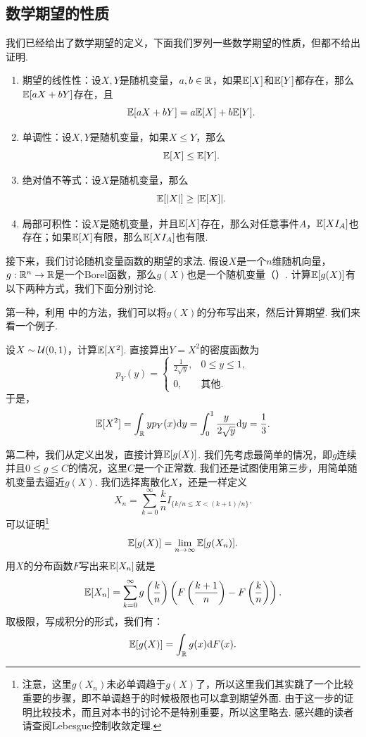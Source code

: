 \subsection{数学期望的性质}

我们已经给出了数学期望的定义，下面我们罗列一些数学期望的性质，但都不给出证明. 

\begin{proposition}\label{proposition:expectation-property}
\begin{enumerate}
\item 期望的线性性：设$X,Y$是随机变量，$a,b\in\mathbb{R}$，如果$\mathbb{E}[X]$和$\mathbb{E}[Y]$都存在，那么$\mathbb{E}[aX+bY]$存在，且
\[\mathbb{E}[aX+bY]=a\mathbb{E}[X]+b\mathbb{E}[Y].\]
\item 单调性：设$X,Y$是随机变量，如果$X\leq Y$，那么
\[\mathbb{E}[X]\leq \mathbb{E}[Y].\]
\item 绝对值不等式：设$X$是随机变量，那么
\[\mathbb{E}[|X|]\geq |\mathbb{E}[X]|.\]
\item 局部可积性：设$X$是随机变量，并且$\mathbb{E}[X]$存在，那么对任意事件$A$，$\mathbb{E}[XI_A]$也存在；如果$\mathbb{E}[X]$有限，那么$\mathbb{E}[XI_A]$也有限. 
\end{enumerate}
\end{proposition}

接下来，我们讨论随机变量函数的期望的求法. 假设$X$是一个$n$维随机向量，$g:\mathbb{R}^n\to\mathbb{R}$是一个Borel函数，那么$g(X)$也是一个随机变量（）. 计算$\mathbb{E}[g(X)]$有以下两种方式，我们下面分别讨论. 

第一种，利用 中的方法，我们可以将$g(X)$的分布写出来，然后计算期望. 我们来看一个例子. 

\begin{example}\label{example:uniform-square}
设$X\sim\mathcal{U}(0,1)$，计算$\mathbb{E}[X^2]$. 直接算出$Y=X^2$的密度函数为
\[p_Y(y)=\begin{cases}
    \frac{1}{2\sqrt{y}},&0\leq y\leq 1,\\
    0,&\text{其他}.
\end{cases}\]
于是，
\[\mathbb{E}[X^2]=\int_{\mathbb{R}} y p_Y(x)\mathrm{d} y=\int_0^1\frac{y}{2\sqrt{y}}\mathrm{d} y=\frac{1}{3}.\]
\end{example}

第二种，我们从定义出发，直接计算$\mathbb{E}[g(X)]$. 我们先考虑最简单的情况，即$g$连续并且$0\leq g\leq C$的情况，这里$C$是一个正常数. 我们还是试图使用第三步，用简单随机变量去逼近$g(X)$. 我们选择离散化$X$，还是一样定义
\[X_n=\sum_{k=0}^\infty\frac{k}{n}I_{\{k/n\leq X<(k+1)/n\}}.\]
可以证明\footnote{注意，这里$g(X_n)$未必单调趋于$g(X)$了，所以这里我们其实跳了一个比较重要的步骤，即不单调趋于的时候极限也可以拿到期望外面. 由于这一步的证明比较技术，而且对本书的讨论不是特别重要，所以这里略去. 感兴趣的读者请查阅Lebesgue控制收敛定理. }
\[\mathbb{E}[g(X)]=\lim_{n\to\infty}\mathbb{E}[g(X_n)].\]
用$X$的分布函数$F$写出来$\mathbb{E}[X_n]$就是
\begin{align*}
    \mathbb{E}[X_n]=\sum_{k=0}^\infty g\left(\frac{k}{n}\right)\left(F\left(\frac{k+1}{n}\right)-F\left(\frac{k}{n}\right)\right).
\end{align*}
取极限，写成积分的形式，我们有：
\[\mathbb{E}[g(X)]=\int_{\mathbb{R}} g(x)\mathrm{d} F(x).\]

